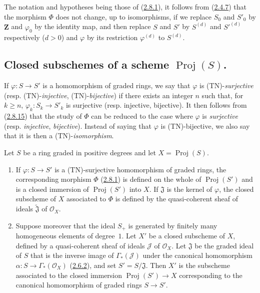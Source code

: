 
\begin{env}[2.8.15]
\label{II.2.8.15}
The notation and hypotheses being those of
(\hyperref[II.2.8.1]{2.8.1}), it follows from
(\hyperref[II.2.4.7]{2.4.7}) that the morphism $\Phi$ does not change, up
to isomorphisms, if we replace $S_0$ and $S'_0$ by $\mathbf{Z}$ and
$\varphi_0$ by the identity map, and then replace $S$ and $S'$ by $S^{(d)}$
and ${S'}^{(d)}$ respectively ($d>0$) and $\varphi$ by its restriction
$\varphi^{(d)}$ to $S^{(d)}$.
\end{env}

\subsection{Closed subschemes of a scheme $\operatorname{Proj}(S)$.}
\label{subsection:II.2.9}

\begin{env}[2.9.1]
\label{II.2.9.1}
If $\varphi:S\to S'$ is a homomorphism of graded rings, we say that
$\varphi$ is (TN)-\emph{surjective} (resp. (TN)-\emph{injective},
(TN)-\emph{bijective}) if there exists an integer $n$ such that, for
$k\geq n$, $\varphi_k:S_k\to S'_k$ is surjective (resp. injective,
bijective). It then follows from (\hyperref[II.2.8.15]{2.8.15}) that the
study of $\Phi$ can be reduced to the case where $\varphi$ is
\emph{surjective} (resp. \emph{injective}, \emph{bijective}). Instead of
saying that $\varphi$ is (TN)-bijective, we also say that it is then a
(TN)-\emph{isomorphism}.
\end{env}

\begin{proposition}[2.9.2]
\label{II.2.9.2}
Let $S$ be a ring graded in positive degrees and let
$X=\operatorname{Proj}(S)$.
\begin{enumerate}
  \item[\rm(i)] If $\varphi:S\to S'$ is a \textup{(TN)}-surjective homomorphism of
    graded rings, the corresponding morphism $\Phi$
    \textup{(\hyperref[II.2.8.1]{2.8.1})} is defined on the whole of
    $\operatorname{Proj}(S')$ and is a closed immersion of
    $\operatorname{Proj}(S')$ into $X$. If $\mathfrak{J}$ is the kernel of
    $\varphi$, the closed subscheme of $X$ associated to $\Phi$ is defined by
    the quasi-coherent sheaf of ideals $\widetilde{\mathfrak{J}}$ of
    $\mathcal{O}_X$.
  \item[\rm(ii)] Suppose moreover that the ideal $S_+$ is generated by
    finitely many homogeneous elements of degree~$1$. Let $X'$ be a closed
    subscheme of $X$, defined by a quasi-coherent sheaf of ideals
    $\mathcal{J}$ of $\mathcal{O}_X$. Let $\mathfrak{J}$ be the graded ideal
    of $S$ that is the inverse image of $\Gamma_*(\mathcal{J})$ under the
    canonical homomorphism $\alpha:S\to\Gamma_*(\mathcal{O}_X)$
    \textup{(\hyperref[II.2.6.2]{2.6.2})}, and set
    $S'=S/\mathfrak{J}$. Then $X'$ is the subscheme associated to the closed
    immersion $\operatorname{Proj}(S')\to X$ corresponding to the canonical
    homomorphism of graded rings $S\to S'$.
\end{enumerate}
\end{proposition}

